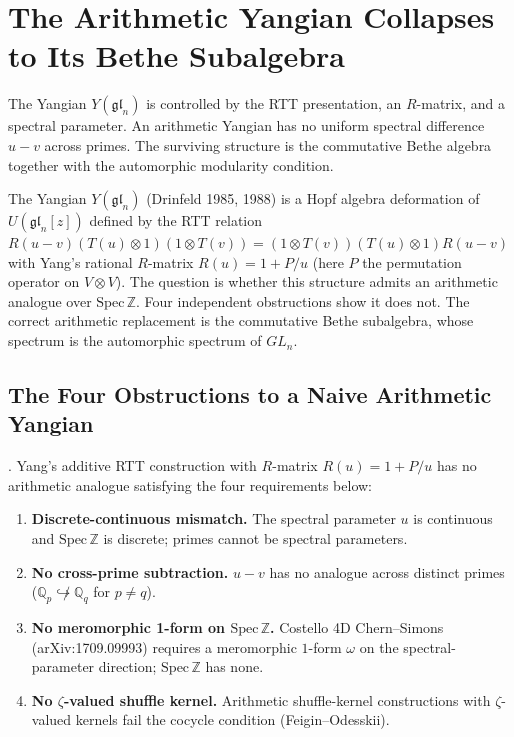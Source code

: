 \chapter{The Arithmetic Yangian Collapses to Its Bethe Subalgebra}
\label{v4-arith:drinfeld-solo}

The Yangian \(Y(\mathfrak{gl}_n)\) is controlled by the RTT
presentation, an \(R\)-matrix, and a spectral parameter. An arithmetic
Yangian has no uniform spectral difference \(u-v\) across primes. The
surviving structure is the commutative Bethe algebra together with the
automorphic modularity condition.

The Yangian \(Y(\mathfrak{gl}_{n})\) (Drinfeld 1985, 1988) is a
Hopf algebra deformation of \(U(\mathfrak{gl}_{n}[z])\) defined by the
RTT relation \(R(u-v)(T(u)\otimes 1)(1\otimes T(v))
=(1\otimes T(v))(T(u)\otimes 1)R(u-v)\)
with Yang's rational \(R\)-matrix \(R(u)=1+P/u\) (here \(P\) the
permutation operator on \(V\otimes V\)).
The question is whether this structure admits an arithmetic analogue
over \(\mathrm{Spec}\,\mathbb{Z}\).
Four independent obstructions show it does not.
The correct arithmetic replacement is the commutative Bethe subalgebra,
whose spectrum is the automorphic spectrum of \(GL_{n}\).

\section{The Four Obstructions to a Naive Arithmetic Yangian}
\label{v4-arith:dr:four-obstructions}

\begin{theorem}
\label{v4-arith:thm:four-obstructions}
\ClaimStatusProvedHere. Yang's additive RTT construction with
\(R\)-matrix \(R(u)=1+P/u\) has no arithmetic analogue satisfying the
four requirements below:
\begin{enumerate}
\item \textbf{Discrete-continuous mismatch.} The spectral parameter
\(u\) is continuous and \(\mathrm{Spec}\,\mathbb{Z}\) is discrete;
primes cannot be spectral parameters.
\item \textbf{No cross-prime subtraction.} \(u-v\) has no analogue
across distinct primes (\(\mathbb{Q}_{p}\not\hookrightarrow\mathbb{Q}_{q}\)
for \(p\neq q\)).
\item \textbf{No meromorphic 1-form on \(\mathrm{Spec}\,\mathbb{Z}\).}
Costello 4D Chern--Simons (arXiv:1709.09993) requires a
meromorphic \(1\)-form \(\omega\) on the spectral-parameter direction;
\(\mathrm{Spec}\,\mathbb{Z}\) has none.
\item \textbf{No \(\zeta\)-valued shuffle kernel.} Arithmetic
shuffle-kernel constructions with \(\zeta\)-valued kernels fail the
cocycle condition (Feigin--Odesskii).
\end{enumerate}
\end{theorem}

